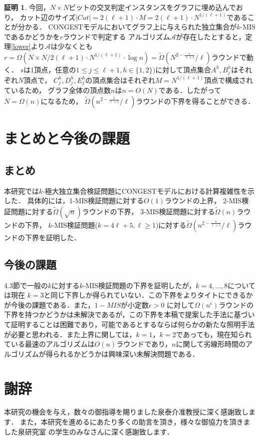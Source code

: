 \documentclass[12pt]{thesis}
\newcommand{\CONGEST}{\textsf{CONGEST}}
\theoremstyle{definition}
\newtheorem*{prf*}{証明}
\begin{document}
\begin{prf*}
今回，$N \times N$ビットの交叉判定インスタンスをグラフに埋め込んでおり，
カット辺のサイズ$|\mathit{Cut}| = 2(\ell + 1) \cdot M = 2(\ell + 1) \cdot N^{1/(\ell + 1)}$であることが分かる．
{\CONGEST}モデルにおいてグラフ上に与えられた独立集合が$k$-MISであるかどうかを$r$ラウンドで判定する
アルゴリズム$\mathcal{A}$が存在したとすると，定理\ref{lower}より$\mathcal{A}$は少なくとも \\
$r = \Omega \left(N \times N/2(\ell + 1) \cdot N^{1/(\ell + 1)} \cdot \log n\right)=\tilde{\Omega}\left(N^{2 - \frac{1}{\ell + 1}}/\ell \right)$ラウンドで動く．
$s$は1頂点，任意の$1\leq j \leq \ell+1, h \in \{1, 2\})$に対して頂点集合$A^{h}, B^{h}_{j}$はそれぞれ$N$頂点で，
$C^{h}_{j},D^{h}_{j},E^{h}_{j}$の頂点集合はそれぞれ$M=N^{1/(\ell + 1)}$頂点で構成されているため，
グラフ全体の頂点数$n$は$n = O(N)$である．したがって$N = \Omega(n)$になるため，
$\tilde{\Omega}\left(n^{2 - \frac{1}{\ell + 1}}/\ell \right)$ラウンドの下界を得ることができる．
\end{prf*}
\newpage

\chapter{まとめと今後の課題}
\section{まとめ}
本研究では$k$-極大独立集合検証問題に{\CONGEST}モデルにおける計算複雑性を示した．
具体的には，1-MIS検証問題に対する$O(1)$ラウンドの上界，
2-MIS検証問題に対する$\tilde{\Omega} (\sqrt{n})$ラウンドの下界，
3-MIS検証問題に対する$\tilde{\Omega} (n)$ラウンドの下界，
$k$-MIS検証問題($k = 4\ell + 5, \ell \geq 1$)に対する$\tilde{\Omega}\left(n^{2 - \frac{1}{\ell + 1}}/\ell \right)$ラウンドの下界を証明した．

\section{今後の課題}
4.3節で一般の$k$に対する$k$-MIS検証問題の下界を証明したが，$k = 4,...,8$については現在
$k=3$と同じ下界しか得られていない．この下界をよりタイトにできるかが今後の課題である．また，$1-MIS$が小定数$\epsilon > 0$
に対して$\Omega(n^{\epsilon})$ラウンドの下界を持つかどうかは未解決であるが，この下界を本稿で提案した手法に基づいて証明することは困難であり，可能であるとするならば何らかの新たな照明手法が必要と思われる．また上界に関しては，$k=1$，$k=2$であっても，現在知られている最速のアルゴリズムは$O(n)$ラウンドであり，$n$に関して劣線形時間のアルゴリズムが得られるかどうかは興味深い未解決問題である．
\newpage

\chapter*{謝辞}
本研究の機会を与え，数々の御指導を賜りました泉泰介准教授に深く感謝致します．
また，本研究を進めるにあたり多くの助言を頂き，様々な御協力を頂きました泉研究室
の学生のみなさんに深く感謝致します．

\newpage


\end{document}

